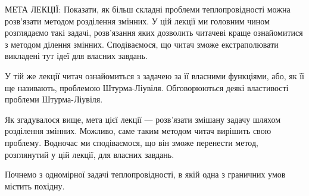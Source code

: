 \documentclass[
  ukrainian,
]{article}
\begin{document}
МЕТА ЛЕКЦІЇ: Показати, як більш складні проблеми теплопровідності можна
розв'язати методом розділення змінних. У цій лекції ми головним чином
розглядаємо такі задачі, розв'язання яких дозволить читачеві краще
ознайомитися з методом ділення змінних. Сподіваємося, що читач зможе
екстраполювати викладені тут ідеї для власних завдань.

У тій же лекції читач ознайомиться з задачею за її власними функціями,
або, як її ще називають, проблемою Штурма-Ліувіля. Обговорюються деякі
властивості проблеми Штурма-Ліувіля.

Як згадувалося вище, мета цієї лекції --- розв'язати змішану задачу
шляхом розділення змінних. Можливо, саме таким методом читач вирішить
свою проблему. Водночас ми сподіваємося, що він зможе перенести метод,
розглянутий у цій лекції, для власних завдань.

Почнемо з одномірної задачі теплопровідності, в якій одна з граничних
умов містить похідну.
\end{document}
